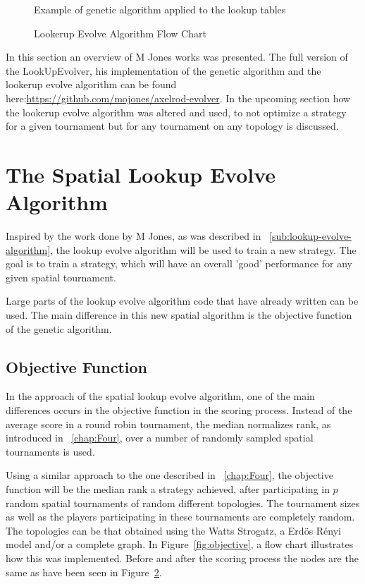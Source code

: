 \begin{figure}[H]
  \caption{Example of genetic algorithm applied to the lookup tables}
		
  \label{fig:example}
\end{figure}

\begin{figure}[H]
		
		\caption{Lookerup Evolve Algorithm Flow Chart}
  \label{fig:flookerup-evolve-flow}
\end{figure}

\newpage
In this section an overview of M Jones works was presented. The full version
of the LookUpEvolver, his implementation of the genetic algorithm and the lookerup evolve
algorithm can be found here:\url{https://github.com/mojones/axelrod-evolver}.
In the upcoming section how the lookerup evolve algorithm was altered and used,
to not optimize a strategy for a given tournament but for any tournament on
any topology is discussed.

\section{The Spatial Lookup Evolve Algorithm}

Inspired by the work done by M Jones, as was described in ~\autoref{sub:lookup-evolve-algorithm},
the lookup evolve algorithm will be used to train a new strategy. The goal is to
train a strategy, which will have an overall 'good' performance for any given
spatial tournament.

Large parts of the lookup evolve algorithm code that have already written
can be used. The main difference in this new spatial algorithm is the objective
function of the genetic algorithm.
\subsection{Objective Function}

In the approach of the spatial lookup evolve algorithm, one of the main differences
occurs in the objective function in the scoring process. Instead of the average
score in a round robin tournament, the median normalizes rank, as introduced
in ~\autoref{chap:Four}, over a number of randomly sampled spatial tournaments
is used.

Using a similar approach to the one described in ~\autoref{chap:Four}, the objective
function will be the median rank a strategy achieved, after participating in \(p\)
random spatial tournaments of random different topologies. The tournament sizes
as well as the players participating in these tournaments are completely random.
The topologies can be that obtained using the Watts Strogatz, a Erd\"{o}s
R\'{e}nyi model and/or a complete graph. In Figure~\ref{fig:objective}, a flow chart
illustrates how this was implemented. Before and after the scoring
process the nodes are the same as have been seen in Figure~\ref{fig:flookerup-evolve-flow}.

